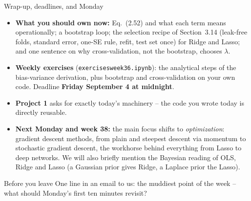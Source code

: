 \documentclass[10pt,aspectratio=169]{beamer}
\begin{document}
\begin{frame}{Wrap-up, deadlines, and Monday}
\begin{itemize}
  \item \textbf{What you should own now:} Eq.~(2.52) and what each term means
        operationally; a bootstrap loop; the selection recipe of
        Section~3.14 (leak-free folds, standard error, one-SE rule, refit,
        test set once) for Ridge and Lasso; and one sentence on why
        cross-validation, not the bootstrap, chooses $\lambda$.
  \item \textbf{Weekly exercises} (\texttt{exercisesweek36.ipynb}): the
        analytical steps of the bias-variance derivation, plus bootstrap and
        cross-validation on your own code.  Deadline \textbf{Friday
        September 4 at midnight}.
  \item \textbf{Project 1} asks for exactly today's machinery -- the code you
        wrote today is directly reusable.
  \item \textbf{Next Monday and week 38:} the main focus shifts to
        \emph{optimization}: gradient descent methods, from plain and
        steepest descent via momentum to stochastic gradient descent, the
        workhorse behind everything from Lasso to deep networks.  We will
        also briefly mention the Bayesian reading of OLS, Ridge and Lasso
        (a Gaussian prior gives Ridge, a Laplace prior the Lasso).
\end{itemize}
\begin{block}{Before you leave}
One line in an email to us: the muddiest point of the week -- what should
Monday's first ten minutes revisit?
\end{block}
\end{frame}
\end{document}
